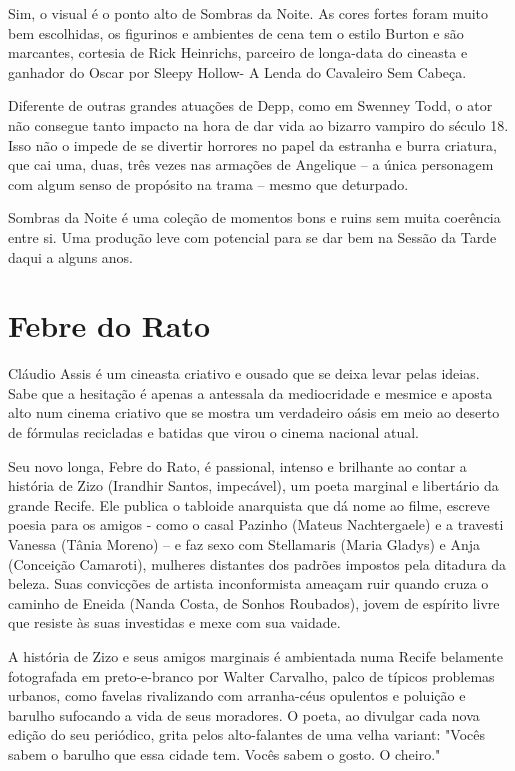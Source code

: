 \documentclass[a4paper,11pt,openright,openbib]{article}
\begin{document}
Sim, o visual é o ponto alto de Sombras da Noite. As cores fortes foram muito bem escolhidas, os figurinos e ambientes de cena tem o estilo Burton e são marcantes, cortesia de Rick Heinrichs, parceiro de longa-data do cineasta e ganhador do Oscar por Sleepy Hollow- A Lenda do Cavaleiro Sem Cabeça.

Diferente de outras grandes atuações de Depp, como em Swenney Todd, o ator não consegue tanto impacto na hora de dar vida ao bizarro vampiro do século 18. Isso não o impede de se divertir horrores no papel da estranha e burra criatura, que cai uma, duas, três vezes nas armações de Angelique – a única personagem com algum senso de propósito na trama – mesmo que deturpado.

Sombras da Noite é uma coleção de momentos bons e ruins sem muita coerência entre si. Uma produção leve com potencial para se dar bem na Sessão da Tarde daqui a alguns anos.

\section{Febre do Rato}
Cláudio Assis é um cineasta criativo e ousado que se deixa levar pelas ideias. Sabe que a hesitação é apenas a antessala da mediocridade e mesmice e aposta alto num cinema criativo que se mostra um verdadeiro oásis em meio ao deserto de fórmulas recicladas e batidas que virou o cinema nacional atual. 

Seu novo longa, Febre do Rato, é passional, intenso e brilhante ao contar a história de Zizo (Irandhir Santos, impecável), um poeta marginal e libertário da grande Recife. Ele publica o tabloide anarquista que dá nome ao filme, escreve poesia para os amigos - como o casal Pazinho (Mateus Nachtergaele) e a travesti Vanessa (Tânia Moreno) – e faz sexo com Stellamaris (Maria Gladys) e Anja (Conceição Camaroti), mulheres distantes dos padrões impostos pela ditadura da beleza. Suas convicções de artista inconformista ameaçam ruir quando cruza o caminho de Eneida (Nanda Costa, de Sonhos Roubados), jovem de espírito livre que resiste às suas investidas e mexe com sua vaidade. 

A história de Zizo e seus amigos marginais é ambientada numa Recife belamente fotografada em preto-e-branco por Walter Carvalho, palco de típicos problemas urbanos, como favelas rivalizando com arranha-céus opulentos e poluição e barulho sufocando a vida de seus moradores. O poeta, ao divulgar cada nova edição do seu periódico, grita pelos alto-falantes de uma velha variant: "Vocês sabem o barulho que essa cidade tem. Vocês sabem o gosto. O cheiro." 
\end{document}
